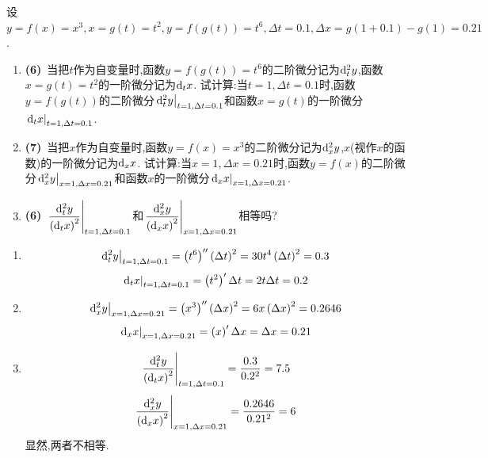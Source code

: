 \documentclass{ctexart}
\begin{document}
\begin{problem}[6.(20\songti{分})]
    设$y=f(x)=x^3,x=g(t)=t^2,y=f(g(t))=t^6,\Delta t=0.1,\Delta x=g(1+0.1)-g(1)=0.21$.
        \begin{enumerate}[label=\textbf{(\arabic*)}]
            \item \textbf{(6)}\ 当把$t$作为自变量时,函数$y=f(g(t))=t^6$的二阶微分记为$\mathrm{d}_t^2y$,函数$x=g(t)=t^2$的一阶微分记为$\mathrm{d}_tx$.
                试计算:当$t=1,\Delta t=0.1$时,函数$y=f(g(t))$的二阶微分$\left.\mathrm{d}_t^2y\right|_{t=1,\Delta t=0.1}$和函数$x=g(t)$的一阶微分$\left.\mathrm{d}_tx\right|_{t=1,\Delta t=0.1}$.
            \item \textbf{(7)}\ 当把$x$作为自变量时,函数$y=f(x)=x^3$的二阶微分记为$\mathrm{d}_x^2y$,$x$(视作$x$的函数)的一阶微分记为$\mathrm{d}_xx$.
                试计算:当$x=1,\Delta x=0.21$时,函数$y=f(x)$的二阶微分$\left.\mathrm{d}_x^2y\right|_{x=1,\Delta x=0.21}$和函数$x$的一阶微分$\left.\mathrm{d}_xx\right|_{x=1,\Delta x=0.21}$.
            \item \textbf{(6)}\ $\left.\dfrac{\mathrm{d}_t^2y}{\left(\mathrm{d}_tx\right)^2}\right|_{t=1,\Delta t=0.1}$和$\left.\dfrac{\mathrm{d}_x^2y}{\left(\mathrm{d}_xx\right)^2}\right|_{x=1,\Delta x=0.21}$相等吗?
        \end{enumerate}
\end{problem}
\begin{solution}
    \begin{enumerate}[label=\textbf{(\arabic*)}]
        \item $$\left.\mathrm{d}_t^2y\right|_{t=1,\Delta t=0.1}=\left(t^6\right)''\left(\Delta t\right)^2=30t^4\left(\Delta t\right)^2=0.3$$
            $$\left.\mathrm{d}_tx\right|_{t=1,\Delta t=0.1}=\left(t^2\right)'\Delta t=2t\Delta t=0.2$$
        \item $$\left.\mathrm{d}_x^2y\right|_{x=1,\Delta x=0.21}=\left(x^3\right)''\left(\Delta x\right)^2=6x\left(\Delta x\right)^2=0.2646$$
            $$\left.\mathrm{d}_xx\right|_{x=1,\Delta x=0.21}=\left(x\right)'\Delta x=\Delta x=0.21$$
        \item $$\left.\dfrac{\mathrm{d}_t^2y}{\left(\mathrm{d}_tx\right)^2}\right|_{t=1,\Delta t=0.1}=\dfrac{0.3}{0.2^2}=7.5$$
            $$\left.\dfrac{\mathrm{d}_x^2y}{\left(\mathrm{d}_xx\right)^2}\right|_{x=1,\Delta x=0.21}=\dfrac{0.2646}{0.21^2}=6$$
            显然,两者不相等.
    \end{enumerate}
\end{solution}
\end{document}
